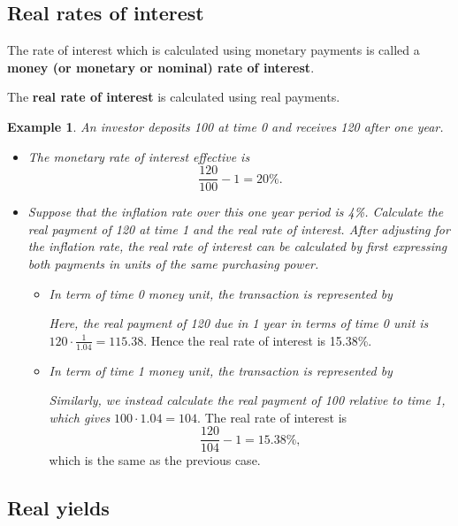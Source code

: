 \documentclass[
]{book}
\theoremstyle{definition}
\theoremstyle{definition}
\newtheorem{example}{Example}[chapter]
\theoremstyle{definition}
\theoremstyle{definition}
\theoremstyle{remark}
\begin{document}
\hypertarget{real-rates-of-interest}{%
\subsection{Real rates of interest}\label{real-rates-of-interest}}

The rate of interest which is calculated using monetary payments is
called a \textbf{money (or monetary or nominal) rate of interest}.

The \textbf{real rate of interest} is calculated using real payments.

\begin{example}

\emph{An investor deposits 100 at time 0 and receives 120 after one year.}

\begin{itemize}
\item
  \emph{The monetary rate of interest effective is}
  \[\frac{120}{100} - 1 = 20\%.\]
\item
  \emph{Suppose that the inflation rate over this one year period is 4\%.
  Calculate the real payment of 120 at time 1 and the real rate of
  interest. After adjusting for the inflation rate, the real rate of
  interest can be calculated by first expressing both payments in
  units of the same purchasing power.}

  \begin{itemize}
  \item
    \emph{In term of time 0 money unit, the transaction is represented
    by}

    \emph{Here, the real payment of 120 due in 1 year in terms of time 0
    unit is} \(\displaystyle{120 \cdot \frac{1}{1.04} = 115.38}\).
    Hence the real rate of interest is 15.38\%.
  \item
    \emph{In term of time 1 money unit, the transaction is represented
    by}

    \emph{Similarly, we instead calculate the real payment of 100
    relative to time 1, which gives} \(100 \cdot 1.04 = 104\). The
    real rate of interest is \[\frac{120}{104} - 1 = 15.38\%,\]
    which is the same as the previous case.
  \end{itemize}
\end{itemize}

\end{example}

\hypertarget{real-yields}{%
\subsection{Real yields}\label{real-yields}}
\end{document}
